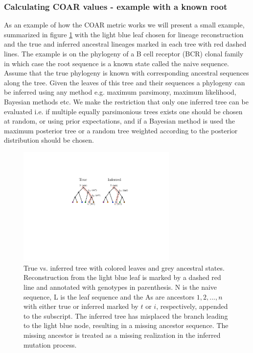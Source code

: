 \subsubsection{Calculating COAR values - example with a known root}
As an example of how the COAR metric works we will present a small example, summarized in figure \ref{fig:ASR_true_vs_inferred} with the light blue leaf chosen for lineage reconstruction and the true and inferred ancestral lineages marked in each tree with red dashed lines.
The example is on the phylogeny of a B cell receptor (BCR) clonal family in which case the root sequence is a known state called the naive sequence.
Assume that the true phylogeny is known with corresponding ancestral sequences along the tree.
Given the leaves of this tree and their sequences a phylogeny can be inferred using any method e.g. maximum parsimony, maximum likelihood, Bayesian methods etc.
We make the restriction that only one inferred tree can be evaluated i.e. if multiple equally parsimonious trees exists one should be chosen at random, or using prior expectations, and if a Bayesian method is used the maximum posterior tree or a random tree weighted according to the posterior distribution should be chosen.

\begin{figure}[ht!]
    \centering
    \includegraphics[width=0.7\textwidth]{figures/ASR_true_vs_inferred.pdf}
    \caption{
        \label{fig:ASR_true_vs_inferred}
        True vs. inferred tree with colored leaves and grey ancestral states. Reconstruction from the light blue leaf is marked by a dashed red line and annotated with genotypes in parenthesis. N is the naive sequence, L is the leaf sequence and the As are ancestors $1,2,...,n$ with either true or inferred marked by $t$ or $i$, respectively, appended to the subscript. The inferred tree has misplaced the branch leading to the light blue node, resulting in a missing ancestor sequence. The missing ancestor is treated as a missing realization in the inferred mutation process.
    }
\end{figure}

